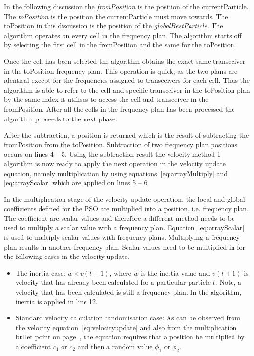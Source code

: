 In the following discussion the \emph{fromPosition} is the position of the currentParticle. The \emph{toPosition} is the position the currentParticle must move towards. The toPosition in this discussion is the position of the \emph{globalBestParticle}.
The algorithm operates on every cell in the frequency plan. The algorithm starts off by selecting the first cell in the fromPosition and the same for the toPosition. 

Once the cell has been selected the algorithm obtains the exact same transceiver in the toPosition frequency plan. This operation is quick, as the two plans are identical except for the frequencies assigned to transceivers for each cell. Thus the algorithm is able to refer to the cell and specific transceiver in the toPosition plan by the same index it utilises to access the cell and transceiver in the fromPosition. After all the cells in the frequency plan has been processed the algorithm proceeds to the next phase.

After the subtraction, a position is returned which is the result of subtracting the fromPosition from the toPosition. Subtraction of two frequency plan positions occurs on lines 4 -- 5. Using the subtraction result the velocity method 1 algorithm is now ready to apply the next operation in the velocity update equation, namely multiplication by using equations~\ref{eq:arrayMultiply} and \ref{eq:arrayScalar} which are applied on lines 5 -- 6.

In the multiplication stage of the velocity update operation, the local and global coefficients defined for the \gls{PSO} are multiplied into a position, i.e. frequency plan. The coefficient are scalar values and therefore a different method needs to be used to multiply a scalar value with a frequency plan. Equation~\ref{eq:arrayScalar} is used to multiply scalar values with frequency plans. Multiplying a frequency plan results in another frequency plan. Scalar values need to be multiplied in for the following cases in the velocity update.
\begin{itemize}
\item The inertia case: $w \times v(t+1)$, where $w$ is the inertia value and $v(t+1)$ is velocity that has already been calculated for a particular particle $t$. Note, a velocity that has been calculated is still a frequency plan. In the algorithm, inertia is applied in line 12.
\item Standard velocity calculation randomisation case: As can be observed from the velocity equation~\ref{eq:velocityupdate} and also from the multiplication bullet point on page~\pageref{lst:velocitybreakup}, the equation requires that a position be multiplied by a coefficient $c_1$ or $c_2$ and then a random value $\phi_1$ or $\phi_2$. 
\end{itemize}

